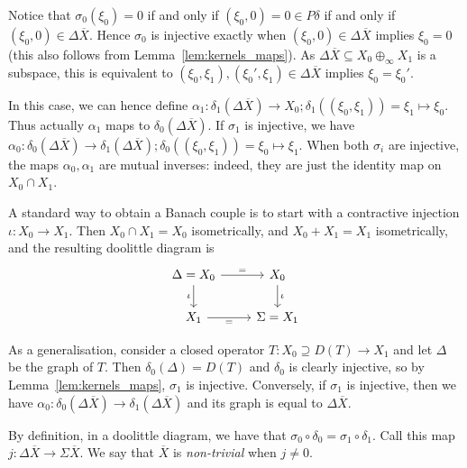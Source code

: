 \documentclass[a4paper,11pt]{article}
\theoremstyle{plain}
\theoremstyle{remark}
\newenvironment{remark}
  {\pushQED{\qed}\renewcommand{\qedsymbol}{$\triangle$}\remarkx}
  {\popQED\endremarkx}
\begin{document}
\begin{remark}
Notice that $\sigma_0(\xi_0)=0$ if and only if $(\xi_0,0)=0 \in P\delta$ if and only if $(\xi_0,0) \in \Delta\overline X$.  Hence $\sigma_0$ is injective exactly when $(\xi_0,0) \in \Delta\overline X$ implies $\xi_0=0$ (this also follows from Lemma~\ref{lem:kernels_maps}).
As $\Delta\overline X \subseteq X_0\oplus_\infty X_1$ is a subspace, this is equivalent to $(\xi_0,\xi_1), (\xi_0',\xi_1) \in \Delta\overline X$ implies $\xi_0=\xi_0'$.

In this case, we can hence define $\alpha_1 \colon \delta_1(\Delta\overline X) \to X_0; \delta_1((\xi_0,\xi_1)) = \xi_1 \mapsto \xi_0$.  Thus actually $\alpha_1$ maps to $\delta_0(\Delta\overline X)$.  If $\sigma_1$ is injective, we have $\alpha_0 \colon \delta_0(\Delta\overline X) \to \delta_1(\Delta\overline X); \delta_0((\xi_0,\xi_1)) = \xi_0 \mapsto \xi_1$.  When both $\sigma_i$ are injective, the maps $\alpha_0, \alpha_1$ are mutual inverses: indeed, they are just the identity map on $X_0 \cap X_1$.

A standard way to obtain a Banach couple is to start with a contractive injection $\iota \colon X_0 \to X_1$.  Then $X_0 \cap X_1 = X_0$ isometrically, and $X_0 + X_1 = X_1$ isometrically, and the resulting doolittle diagram is
\[ \begin{tikzcd}
\Delta = X_0  \arrow[r, "="] \arrow[d, "\iota"'] & X_0 \arrow[d, "\iota"] \\
X_1 \arrow[r, "="'] & \Sigma = X_1
\end{tikzcd} \]

As a generalisation, consider a closed operator $T \colon X_0 \supseteq D(T) \to X_1$ and let $\Delta$ be the graph of $T$.  Then $\delta_0(\Delta) = D(T)$ and $\delta_0$ is clearly injective, so by Lemma~\ref{lem:kernels_maps}, $\sigma_1$ is injective.  Conversely, if $\sigma_1$ is injective, then we have $\alpha_0 \colon \delta_0(\Delta\overline X) \to \delta_1(\Delta\overline X)$ and its graph is equal to $\Delta\overline X$.
\end{remark}

By definition, in a doolittle diagram, we have that $\sigma_0\circ \delta_0 = \sigma_1 \circ \delta_1$.  Call this map $j \colon \Delta\overline X \to \Sigma\overline X$.  We say that $\overline X$ is \emph{non-trivial} when $j\not=0$.
\end{document}
